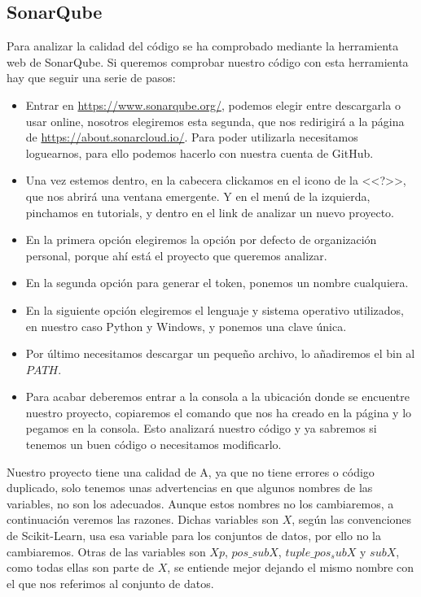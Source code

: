 \subsection{SonarQube}
Para analizar la calidad del código se ha comprobado mediante la herramienta web de SonarQube.
Si queremos comprobar nuestro código con esta herramienta hay que seguir una serie de pasos:
\begin{itemize}
	\item Entrar en \url{https://www.sonarqube.org/}, podemos elegir entre descargarla o usar online, nosotros elegiremos esta segunda, que nos redirigirá a la página de \url{https://about.sonarcloud.io/}. Para poder utilizarla necesitamos loguearnos, para ello podemos hacerlo con nuestra cuenta de GitHub.
	\item Una vez estemos dentro, en la cabecera clickamos en el icono de la <<?>>, que nos abrirá una ventana emergente. Y en el menú de la izquierda, pinchamos en tutorials, y dentro en el link de analizar un nuevo proyecto.
	\item En la primera opción elegiremos la opción por defecto de organización personal, porque ahí está el proyecto que queremos analizar.
	\item En la segunda opción para generar el token, ponemos un nombre cualquiera.
	\item En la siguiente opción elegiremos el lenguaje y sistema operativo utilizados, en nuestro caso Python y Windows, y ponemos una clave única.
	\item Por último necesitamos descargar un pequeño archivo, lo añadiremos el bin al $PATH$.
	\item Para acabar deberemos entrar a la consola a la ubicación donde se encuentre nuestro proyecto, copiaremos el comando que nos ha creado en la página y lo pegamos en la consola. Esto analizará nuestro código y ya sabremos si tenemos un buen código o necesitamos modificarlo.
\end{itemize}

Nuestro proyecto tiene una  calidad de A, ya que no tiene errores o código duplicado, solo tenemos unas advertencias en que algunos nombres de las variables, no son los adecuados. Aunque estos nombres no los cambiaremos, a continuación veremos las razones. Dichas variables son $X$, según las convenciones de Scikit-Learn, usa esa variable para los conjuntos de datos, por ello no la cambiaremos. Otras de las variables son $Xp$, $pos\_subX$, $tuple\_pos_subX$ y $subX$,  como todas ellas son parte de $X$, se entiende mejor dejando el mismo nombre con el que nos referimos al conjunto de datos.


